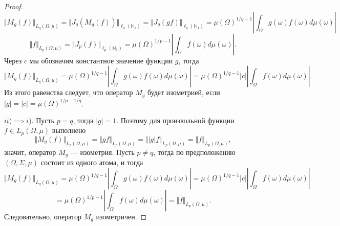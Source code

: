\begin{proof}
$$
\Vert M_g(f)\Vert_{L_q(\Omega,\mu)}
=\Vert J_q(M_g(f))\Vert_{\ell_q(\mathbb{N}_1)}
=\Vert J_q(g  f)\Vert_{\ell_q(\mathbb{N}_1)}
=\mu(\Omega)^{1/q-1}\left|\int_\Omega g(\omega) f(\omega)d\mu(\omega)\right|
$$
$$
\Vert f\Vert_{L_p(\Omega,\mu)}
=\Vert J_p(f)\Vert_{\ell_p(\mathbb{N}_1)}
=\mu(\Omega)^{1/p-1}\left|\int_\Omega f(\omega)d\mu(\omega)\right|.
$$
Через $c$ мы обозначим константное значение функции $g$, тогда
$$
\Vert M_g(f)\Vert_{L_q(\Omega,\mu)}
=\mu(\Omega)^{1/q-1}\left|\int_\Omega g(\omega) f(\omega)d\mu(\omega)\right|
=\mu(\Omega)^{1/q-1}|c|\left|\int_\Omega f(\omega)d\mu(\omega)\right|.
$$
Из этого равенства следует, что оператор $M_g$ будет изометрией, если $|g|=|c|=\mu(\Omega)^{1/p-1/q}$.

$ii)$$\implies$$ i)$. Пусть $p=q$, тогда $|g|=1$. Поэтому для произвольной функции $f\in L_p(\Omega,\mu)$ выполнено
$$
\Vert M_g(f)\Vert_{L_p(\Omega,\mu)}
=\Vert g  f\Vert_{L_p(\Omega,\mu)}
=\Vert |g|  f\Vert_{L_p(\Omega,\mu)}
=\Vert f\Vert_{L_p(\Omega,\mu)},
$$
значит, оператор $M_g$ --- изометрия. Пусть $p\neq q$, тогда по предположению $(\Omega,\Sigma,\mu)$ состоит из одного атома, и тогда
$$
\Vert M_g(f)\Vert_{L_q(\Omega,\mu)}
=\mu(\Omega)^{1/q-1}\left|\int_\Omega g(\omega) f(\omega)d\mu(\omega)\right|
=\mu(\Omega)^{1/q-1}|c|\left|\int_\Omega f(\omega)d\mu(\omega)\right|
$$
$$
=\mu(\Omega)^{1/p-1}\left|\int_\Omega f(\omega)d\mu(\omega)\right|
=\Vert f\Vert_{L_p(\Omega,\mu)}.
$$
Следовательно, оператор $M_g$ изометричен.
\end{proof}

